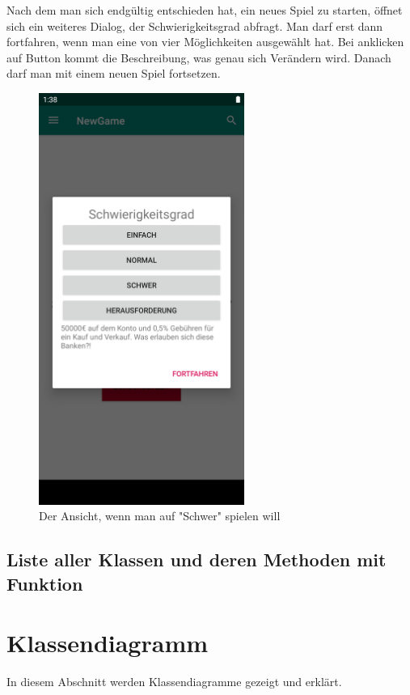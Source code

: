 \documentclass[10pt]{scrartcl}
\begin{document}
Nach dem man sich endgültig entschieden hat, ein neues Spiel zu starten, öffnet sich ein weiteres Dialog, der Schwierigkeitsgrad abfragt. Man darf erst dann fortfahren, wenn man eine von vier Möglichkeiten ausgewählt hat. Bei anklicken auf Button kommt die Beschreibung, was genau sich Verändern wird. Danach darf man mit einem neuen Spiel fortsetzen.

\begin{figure}[H]
	\centering
	\includegraphics[width=0.6\textwidth]{Bilder/Applikation/schwierigkeitsgrad.png}
	\caption{Der Ansicht, wenn man auf "Schwer" spielen will}
\end{figure}

\subsection{Liste aller Klassen und deren Methoden mit Funktion}
\section{Klassendiagramm}
In diesem Abschnitt werden Klassendiagramme gezeigt und erklärt.
\end{document}
